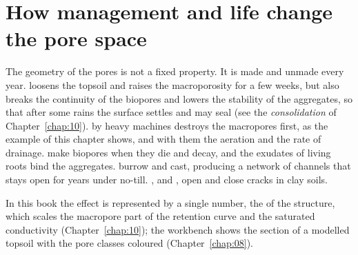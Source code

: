 \section{How management and life change the pore space}
The geometry of the pores is not a fixed property. It is made and unmade every year.  loosens the topsoil and raises the macroporosity for a few weeks, but also breaks the continuity of the biopores and lowers the stability of the aggregates, so that after some rains the surface settles and may seal (see the \emph{consolidation} of Chapter~\ref{chap:10}).  by heavy machines destroys the macropores first, as the example of this chapter shows, and with them the aeration and the rate of drainage.  make biopores when they die and decay, and the exudates of living roots bind the aggregates.  burrow and cast, producing a network of channels that stays open for years under no-till. , and , open and close cracks in clay soils.
\par\noindent In this book the effect is represented by a single number, the  of the structure, which scales the macropore part of the retention curve and the saturated conductivity (Chapter~\ref{chap:10}); the workbench shows the section of a modelled topsoil with the pore classes coloured (Chapter~\ref{chap:08}).

